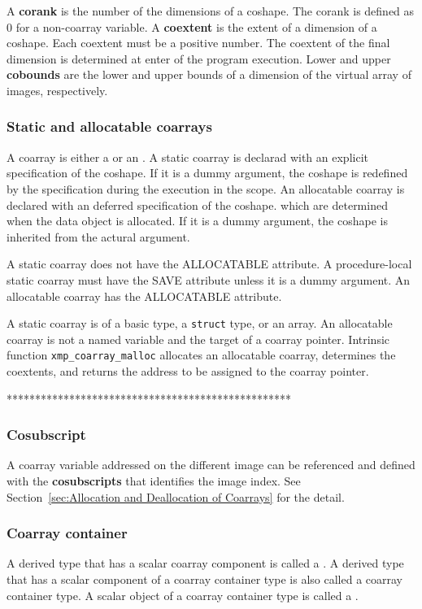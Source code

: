 A {\bf corank} is the number of the dimensions of a coshape.
The corank is defined as 0 for a non-coarray variable.
%
A {\bf coextent} is the extent of a dimension of a coshape.
Each coextent must be a positive number.
The coextent of the final dimension is determined at enter of the 
program execution.
%
Lower and upper {\bf cobounds} are the lower and upper bounds of a
dimension of the virtual array of images, respectively. 


\subsubsection*{Static and allocatable coarrays}
A coarray is either a  or an .
%
A static coarray is declarad with an explicit specification of the coshape.
If it is a dummy argument, the coshape is redefined by the specification during 
the execution in the scope.
%
An allocatable coarray is declared with an deferred specification of the coshape.
which are determined when the data object is allocated.
If it is a dummy argument, the coshape is inherited from the actural argument.

{\onlyF} 
A static coarray does not have the ALLOCATABLE attribute.
A procedure-local static coarray must have the SAVE attribute 
unless it is a dummy argument.
An allocatable coarray has the ALLOCATABLE attribute.

{\onlyC} 
A static coarray is of a basic type, a {\tt struct} type, or an array.
An allocatable coarray is not a named variable and the target of a coarray pointer.
Intrinsic function {\tt xmp\_coarray\_malloc} allocates an allocatable coarray,
determines the coextents, and returns the address to be assigned to the coarray pointer.


**************************************************


\subsubsection*{Cosubscript}
A coarray variable addressed on the different image can be 
referenced and defined with the {\bf cosubscripts} that identifies the image index.
See Section~\ref{sec:Allocation and Deallocation of Coarrays} for the detail.

\subsubsection*{Coarray container}
{\onlyF}
A derived type that has a scalar coarray component is called 
a .
A derived type that has a scalar component of a coarray container type 
is also called a coarray container type.
A scalar object of a coarray container type is called 
a .

